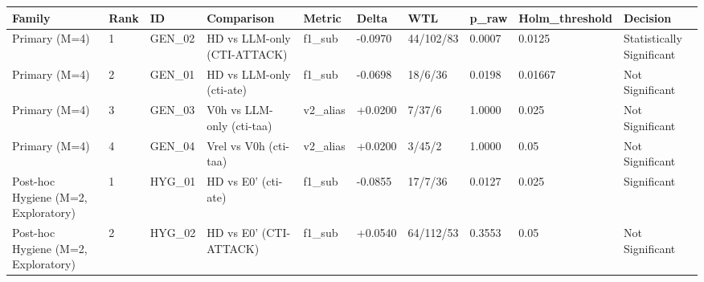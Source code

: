 \begin{tabular}{llllllllll}
\toprule
Family & Rank & ID & Comparison & Metric & Delta & WTL & p\_raw & Holm\_threshold & Decision \\
\midrule
Primary (M=4) & 1 & GEN\_02 & HD vs LLM-only (CTI-ATTACK) & f1\_sub & -0.0970 & 44/102/83 & 0.0007 & 0.0125 & Statistically Significant \\
Primary (M=4) & 2 & GEN\_01 & HD vs LLM-only (cti-ate) & f1\_sub & -0.0698 & 18/6/36 & 0.0198 & 0.01667 & Not Significant \\
Primary (M=4) & 3 & GEN\_03 & V0h vs LLM-only (cti-taa) & v2\_alias & +0.0200 & 7/37/6 & 1.0000 & 0.025 & Not Significant \\
Primary (M=4) & 4 & GEN\_04 & Vrel vs V0h (cti-taa) & v2\_alias & +0.0200 & 3/45/2 & 1.0000 & 0.05 & Not Significant \\
Post-hoc Hygiene (M=2, Exploratory) & 1 & HYG\_01 & HD vs E0' (cti-ate) & f1\_sub & -0.0855 & 17/7/36 & 0.0127 & 0.025 & Significant \\
Post-hoc Hygiene (M=2, Exploratory) & 2 & HYG\_02 & HD vs E0' (CTI-ATTACK) & f1\_sub & +0.0540 & 64/112/53 & 0.3553 & 0.05 & Not Significant \\
\bottomrule
\end{tabular}
